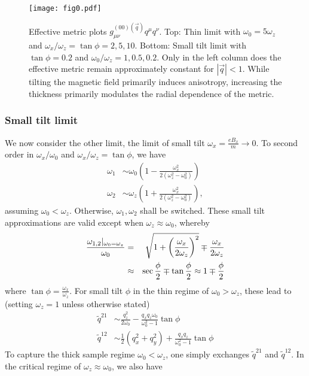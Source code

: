 \documentclass[twocolumn,showpacs,amsmath,amstex,amssymb,mathfonts,prb]{revtex4-1}
\begin{document}
\begin{figure*}[htb]
\texttt{[image: fig0.pdf]}
\caption{Effective metric plots $g^{(00)(\vec q)}_{\mu\nu}q^\mu q^\nu$. Top: Thin limit with $\omega_0=5\omega_z$ and $\omega_x/\omega_z=\tan\phi=2,5,10$. Bottom: Small tilt limit with $\tan\phi=0.2$ and $\omega_0/\omega_z=1,0.5,0.2$. Only in the left column does the effective metric remain approximately constant for $|\vec q|<1$. While tilting the magnetic field primarily induces anisotropy, increasing the thickness primarily modulates the radial dependence of the metric.  }
\label{LLmetric}
\end{figure*}


\subsubsection{Small tilt limit}
We now consider the other limit, the limit of small tilt $\omega_x=\frac{eB_x}{m}\rightarrow 0$. To second order in $\omega_x/\omega_0$ and $\omega_x/\omega_z=\tan\phi$, we have %
\begin{align}
\omega_1&\sim \omega_0\left(1-\frac{\omega_x^2}{2(\omega_z^2-\omega_0^2)}\right)\\
\omega_2&\sim \omega_z\left(1+\frac{\omega_x^2}{2(\omega_z^2-\omega_0^2)}\right),
\end{align}
assuming $\omega_0<\omega_z$. Otherwise, $\omega_1,\omega_2$ shall be switched. These small tilt approximations are valid except when $\omega_z\approx \omega_0$, whereby 
\begin{eqnarray}
\frac{\omega_{1,2}|_{\omega_0= \omega_z}}{\omega_0}&=&\sqrt{1+\left(\frac{\omega_x}{2\omega_z}\right)^2}\mp \frac{\omega_x}{2\omega_z}\notag\\
&\approx & \sec\frac{\phi}{2}\mp \tan \frac{\phi}{2}\approx 1\mp \frac{\phi}{2}
\end{eqnarray}
where $\tan\phi=\frac{\omega_x}{\omega_z}$. For small tilt $\phi$ in the thin regime of $\omega_0>\omega_z$, these lead to (setting $\omega_z=1$ unless otherwise stated)
\begin{align}
\tilde q^{21}&\sim \frac{q_z^2}{2\omega_0}-\frac{q_xq_z\omega_0}{\omega_0^2-1}\tan\phi \\
\tilde q^{12}&\sim \frac1{2}(q_x^2+q_y^2)+\frac{q_xq_z}{\omega^2_0-1}\tan\phi
\label{q12q21b}
\end{align}
To capture the thick sample regime $\omega_0<\omega_z$, one simply exchanges $\tilde q^{21}$ and $\tilde q^{12}$. In the critical regime of $\omega_z\approx \omega_0$, we also have
\end{document}
